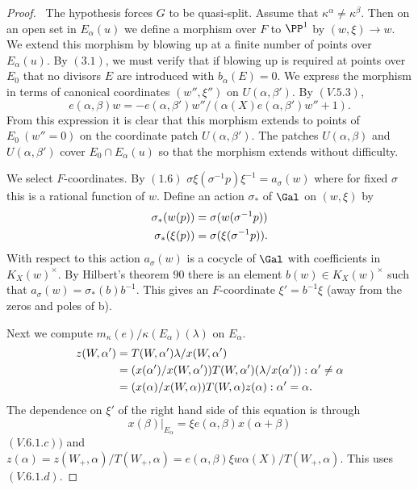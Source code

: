 \documentclass{memo-l}
\theoremstyle{definition}
\theoremstyle{remark}
\numberwithin{section}{chapter}
\numberwithin{equation}{chapter}
\begin{document}
\begin{proof} \ The hypothesis forces $G$ to be quasi-split.  Assume
that ${\kappa}^{{\alpha}} \ne {\kappa}^{{\beta}}$.  Then on an open set in
$E_{{\alpha}}(u)$ we define a morphism over $F$ to ${\PP}^{1}$ by
$(w,{\xi}) {\to} w$.  We extend this morphism by blowing up at a finite
number of points over $E_{{\alpha}}(u)$.  By $(3.1)$, we must verify that
if blowing up is required at points over $E_{0}$ that no divisors $E$ are
introduced with $b_{{\alpha}}(E)  =  0$.  We express the morphism in terms of
canonical coordinates $(w'',{\xi}'')$ on $U({\alpha},{\beta}')$.  By $(V.5.3)$,
$$
e({\alpha},{\beta})w  = 
-e({\alpha},{\beta}')w''/({\alpha}(X)e({\alpha},{\beta}')w''+1).
$$
From this expression it is clear that this morphism extends to points of
$E_{0} \ (w'' = 0)$ on the coordinate patch $U({\alpha},{\beta}')$.  The patches
$U({\alpha},{\beta})$ and $U({\alpha},{\beta}')$ cover $E_{0}  \cap 
E_{{\alpha}}(u)$ so that the morphism extends without difficulty.

   We select $F$-coordinates.  By $(1.6)$\quad
${\sigma}{\xi}({\sigma}^{-1}p){\xi}^{-1}  =  a_{{\sigma}}(w)$ where for fixed
${\sigma}$ this is a rational function of $w$.  Define an action
${\sigma}_{*}$ of $\Gal$ on $(w,{\xi})$ by
$$
\aligned
{\sigma}_{*}(w(p))  &=  {\sigma}(w({\sigma}^{-1}p)) \\
{\sigma}_{*}({\xi}(p))  &=  {\sigma}({\xi}({\sigma}^{-1}p)) .
\endaligned
$$
With respect to this action $a_{{\sigma}}(w)$ is a cocycle of $\Gal$ 
with coefficients in $K_X(w)^{\times}$.  By Hilbert's theorem $90$ there
is an element $b(w)  \in  K_X(w)^{\times}$ such that $a_{{\sigma}}(w)  = 
{\sigma}_{*}(b)b^{-1}$.  This gives an $F$-coordinate ${\xi}' = b^{-1}{\xi}$
(away from the zeros and poles of b).

   Next we compute $m_{{\kappa}}(e)/{\kappa}(E_{{\alpha}})({\lambda})$ on
$E_{{\alpha}}$.  
$$
\aligned
z(W,{\alpha}')  &= T(W,{\alpha}'){\lambda}/x(W,{\alpha}')  \\
                &= (x({\alpha}')/x(W,{\alpha}'))T(W,{\alpha}')({\lambda}/x({\alpha}')) :
{\alpha}' \ne {\alpha} \\
		&=  (x({\alpha})/x(W,{\alpha}))T(W,{\alpha})z({\alpha}) :
{\alpha}' = {\alpha} .
\endaligned
$$
The dependence on ${\xi}'$ of the right hand side of this equation is
through $$x({\beta})\vert _{E_\alpha}  = 
{\xi}e({\alpha},{\beta})x({\alpha}+{\beta})$$ $(V.6.1.c))$ and $z({\alpha})  = 
z(W_{+},{\alpha})/T(W_{+},{\alpha})  = 
e({\alpha},{\beta}){\xi}w{\alpha}(X)/T(W_{+},{\alpha})$.  This 
uses $(V.6.1.d)$.


\end{proof}
\end{document}
